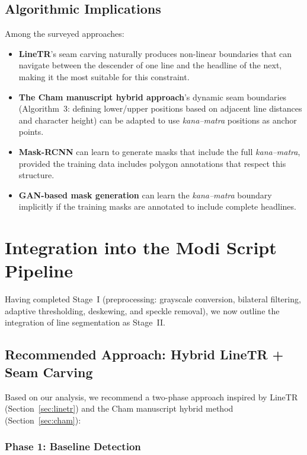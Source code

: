 \documentclass[11pt, a4paper]{article}
\begin{document}
\subsection{Algorithmic Implications}

Among the surveyed approaches:
\begin{itemize}[leftmargin=1.5em]
    \item \textbf{LineTR}'s seam carving naturally produces non-linear boundaries that can navigate between the descender of one line and the headline of the next, making it the most suitable for this constraint.
    \item \textbf{The Cham manuscript hybrid approach}'s dynamic seam boundaries (Algorithm~3: defining lower/upper positions based on adjacent line distances and character height) can be adapted to use \textit{kana--matra} positions as anchor points.
    \item \textbf{Mask-RCNN} can learn to generate masks that include the full \textit{kana--matra}, provided the training data includes polygon annotations that respect this structure.
    \item \textbf{GAN-based mask generation} can learn the \textit{kana--matra} boundary implicitly if the training masks are annotated to include complete headlines.
\end{itemize}


\section{Integration into the Modi Script Pipeline}
\label{sec:integration}

Having completed Stage~I (preprocessing: grayscale conversion, bilateral filtering, adaptive thresholding, deskewing, and speckle removal), we now outline the integration of line segmentation as Stage~II.

\subsection{Recommended Approach: Hybrid LineTR + Seam Carving}

Based on our analysis, we recommend a two-phase approach inspired by LineTR (Section~\ref{sec:linetr}) and the Cham manuscript hybrid method (Section~\ref{sec:cham}):

\subsubsection{Phase 1: Baseline Detection}
\end{document}
